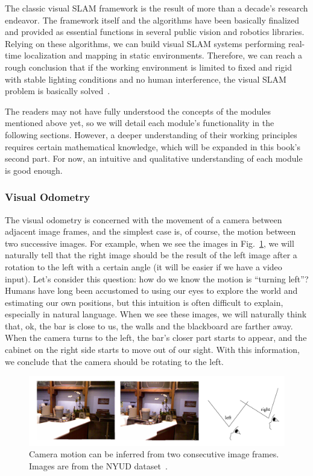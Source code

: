 The classic visual SLAM framework is the result of more than a decade's research endeavor. The framework itself and the algorithms have been basically finalized and provided as essential functions in several public vision and robotics libraries. Relying on these algorithms, we can build visual SLAM systems performing real-time localization and mapping in static environments. Therefore, we can reach a rough conclusion that if the working environment is limited to fixed and rigid with stable lighting conditions and no human interference, the visual SLAM problem is basically solved~\cite{Cadena2016}.

The readers may not have fully understood the concepts of the modules mentioned above yet, so we will detail each module's functionality in the following sections. However, a deeper understanding of their working principles requires certain mathematical knowledge, which will be expanded in this book's second part. For now, an intuitive and qualitative understanding of each module is good enough.

\subsubsection{Visual Odometry}

The visual odometry is concerned with the movement of a camera between adjacent image frames, and the simplest case is, of course, the motion between two successive images. For example, when we see the images in Fig.~\ref{fig:cameramotion}, we will naturally tell that the right image should be the result of the left image after a rotation to the left with a certain angle (it will be easier if we have a video input). Let's consider this question: how do we know the motion is ``turning left''? Humans have long been accustomed to using our eyes to explore the world and estimating our own positions, but this intuition is often difficult to explain, especially in natural language. When we see these images, we will naturally think that, ok, the bar is close to us, the walls and the blackboard are farther away. When the camera turns to the left, the bar's closer part starts to appear, and the cabinet on the right side starts to move out of our sight. With this information, we conclude that the camera should be rotating to the left.

\begin{figure}
    \centering
    \includegraphics[width=1.0\textwidth]{./resources/whatIsSLAM/cameramotion.pdf}
    \caption{Camera motion can be inferred from two consecutive image frames. Images are from the NYUD dataset~\cite{Silberman2012}.}
    \label{fig:cameramotion}
\end{figure}

